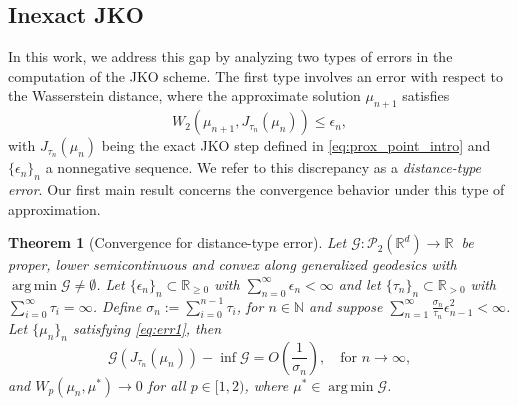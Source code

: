 \documentclass[11pt]{article}
\DeclareMathOperator*{\argmin}{arg\,min}
\newtheorem{theorem}{Theorem}[section]
\newcommand{\cP}{\mathcal{P}}
\newcommand{\cG}{\mathcal{G}}
\newcommand{\R}{\mathbb{R}}
\numberwithin{equation}{section}
\begin{document}
\subsection{Inexact JKO}

In this work, we address this gap by analyzing two types of errors in the computation of the JKO scheme. The first type involves an error with respect to the Wasserstein distance, where the approximate solution $ \mu_{n+1} $ satisfies
\begin{equation}\label{eq:err1}
	W_2(\mu_{n+1}, J_{\tau_n}(\mu_n)) \leq \epsilon_n,
\end{equation}
with $ J_{\tau_n}(\mu_n) $ being the exact JKO step defined in \eqref{eq:prox_point_intro} and $\{\epsilon_n\}_n$ a nonnegative sequence. We refer to this discrepancy as a \emph{distance-type error}. Our first main result concerns the convergence behavior under this type of approximation.
\begin{theorem}[Convergence for distance-type error]\label{thm:JKO_intro_convergence1}
	Let $\cG : \cP_2(\R^d) \to \mathbb{R} \ $ be proper, lower semicontinuous and convex along generalized geodesics with $\argmin \cG \neq \emptyset$. Let $\{\epsilon_n\}_n\subset \mathbb{R}_{\geq 0}$ with $\sum_{n=0}^{\infty} \epsilon_n < \infty$ and let $\{\tau_n\}_n \subset \mathbb{R}_{> 0}$ with $\sum_{i=0}^{\infty}\tau_i= \infty$. Define $\sigma_n:= \sum_{i=0}^{n-1}\tau_i$, for $n\in\mathbb{N}$ and suppose $\sum_{n=1}^{\infty}\frac{\sigma_n}{\tau_n}\epsilon_{n-1}^2  < \infty$. Let $\{\mu_n\}_n$ satisfying \eqref{eq:err1}, then 
	\[\cG(J_{\tau_n}(\mu_n))-\inf \cG = O\left(\frac{1}{\sigma_n}\right), \quad \text{for } n\to \infty,\]
	and $W_p(\mu_n,\mu^*)\to 0$ for all $p\in [1,2)$, where $\mu^*\in \argmin \cG$.
\end{theorem}
\end{document}
